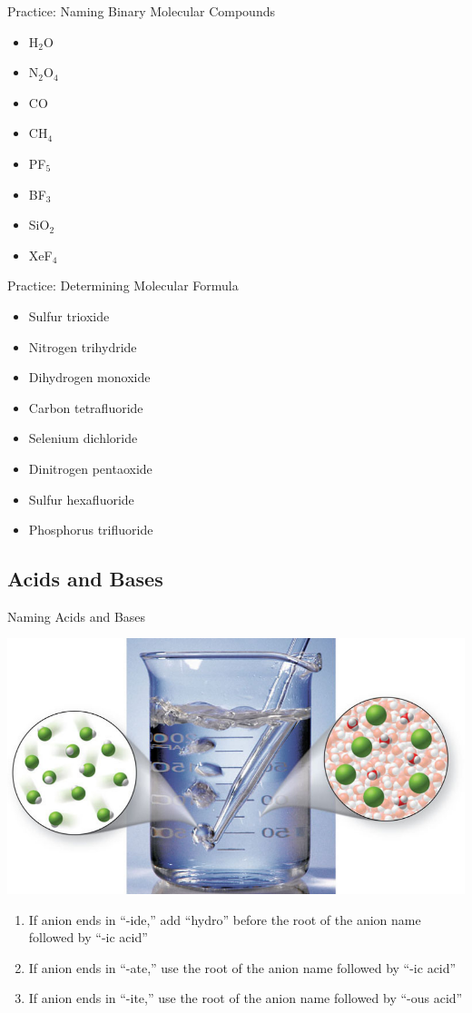 \documentclass[11pt]{beamer}
\begin{document}
\begin{frame}{Practice: Naming Binary Molecular Compounds}
  \begin{itemize}
  \item H$_2$O
  \item N$_2$O$_4$
  \item CO
  \item CH$_4$
  \item PF$_5$
  \item BF$_3$
  \item SiO$_2$
  \item XeF$_4$
  \end{itemize}
\end{frame}

\begin{frame}{Practice: Determining Molecular Formula}
  \begin{itemize}
  \item Sulfur trioxide
  \item Nitrogen trihydride
  \item Dihydrogen monoxide
  \item Carbon tetrafluoride
  \item Selenium dichloride
  \item Dinitrogen pentaoxide
  \item Sulfur hexafluoride
  \item Phosphorus trifluoride
  \end{itemize}
\end{frame}

\subsection{Acids and Bases}

\begin{frame}{Naming Acids and Bases}
  \begin{center}
    \includegraphics[width=0.5\linewidth]{acid_base}
  \end{center}

  \begin{enumerate}
  \item If anion ends in ``-ide,'' add ``hydro'' before the
    root of the anion name followed by ``-ic acid''
  \item If anion ends in ``-ate,'' use the root of the anion
    name followed by ``-ic acid''
  \item If anion ends in ``-ite,'' use the root of the anion
    name followed by ``-ous acid''
  \end{enumerate}
\end{frame}
\end{document}
